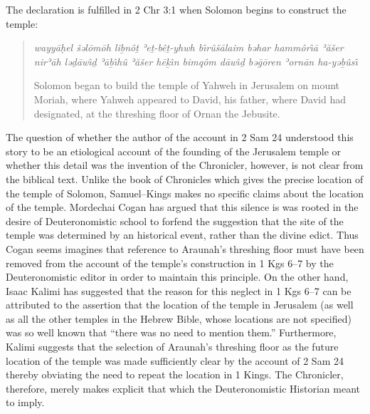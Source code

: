 The declaration is fulfilled in 2 Chr 3:1 when Solomon begins to
construct the temple:

\begin{quote}
\emph{wayyāḥel šəlōmōh liḇnôṯ ʾeṯ-bêṯ-yhwh bı̂rûšālaim bəhar hammôrı̂ā
ʾăšer nirʾāh ləḏāwı̂ḏ ʾāḇı̂hû ʾăšer hēḵı̂n bimqôm dāwı̂ḏ bəḡōren ʾornān
ha-yəḇûsı̂}

Solomon began to build the temple of Yahweh in Jerusalem on mount
Moriah, where Yahweh appeared to David, his father, where David had
designated, at the threshing floor of Ornan the Jebusite.
\end{quote}

The question of whether the author of the account in 2 Sam 24 understood
this story to be an etiological account of the founding of the Jerusalem
temple or whether this detail was the invention of the Chronicler,
however, is not clear from the biblical text. Unlike the book of
Chronicles which gives the precise location of the temple of Solomon,
Samuel--Kings makes no specific claims about the location of the temple.
Mordechai Cogan has argued that this silence is was rooted in the desire
of Deuteronomistic school to forfend the suggestion that the site of the
temple was determined by an historical event, rather than the divine
edict.\autocite[307]{cogan_tarbiz1986} Thus Cogan seems imagines that
reference to Araunah's threshing floor must have been removed from the
account of the temple's construction in 1 Kgs 6--7 by the
Deuteronomistic editor in order to maintain this
principle.\autocite[307]{cogan_tarbiz1986} On the other hand, Isaac
Kalimi has suggested that the reason for this neglect in 1 Kgs 6--7 can
be attributed to the assertion that the location of the temple in
Jerusalem (as well as all the other temples in the Hebrew Bible, whose
locations are not specified) was so well known that ``there was no need
to mention them.''\autocite[I would, however, make the observation that,
depending on how one dates the account in 1 Kng 6--7, it may be the case
that an \emph{exilic} author genuinely did not know the precise location
of the temple. However, Kalimi also points out that other ANE temple
building texts often neglect to specify the precise location of their
subjects. On this point, I would also hasten to add that monumental
inscriptions should be treated separately, since the location of the
inscription, ostensibly, \emph{would be} the location of the
temple.][355--356]{kalimi_htr1990} Furthermore, Kalimi suggests that the
selection of Araunah's threshing floor as the future location of the
temple was made sufficiently clear by the account of 2 Sam 24 thereby
obviating the need to repeat the location in 1
Kings.\autocite[357]{kalimi_htr1990} The Chronicler, therefore, merely
makes explicit that which the Deuteronomistic Historian meant to imply.


